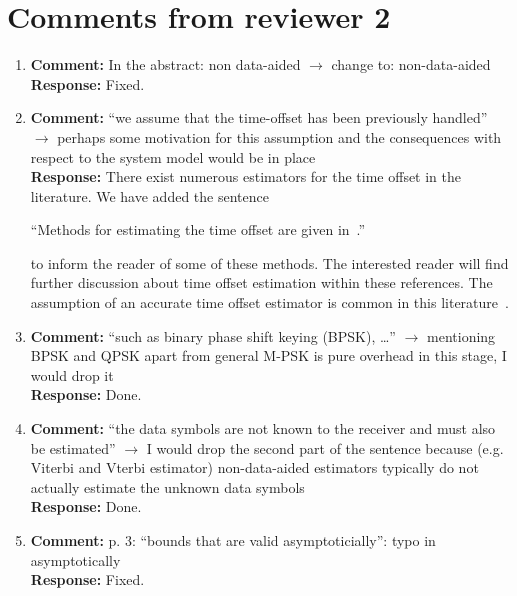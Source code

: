 \documentclass{article}
\begin{document}
\section{Comments from reviewer 2}

\begin{enumerate}

\item \textbf{Comment:} In the abstract: non data-aided $\to$ change to: non-data-aided \\
\textbf{Response:} Fixed.

\item \textbf{Comment:} ``we assume that the time-offset has been previously handled'' $\to$ perhaps some motivation for this assumption and the consequences with respect to the system model would be in place \\
\textbf{Response:}  There exist numerous estimators for the time offset in the literature.  We have added the sentence 

``Methods for estimating the time offset are given in~\cite{Massey1972optimumframe,Oerder_synch_square_circstat_2008,McKilliam_time_offset_pilots_data_2013}.'' 

to inform the reader of some of these methods.  The interested reader will find further discussion about time offset estimation within these references.  The assumption of an accurate time offset estimator is common in this literature~\cite{ViterbiViterbi_phase_est_1983,Cowley_ref_sym_carr_1998,Wilson1989,Makrakis1990,Liu1991,Mackenthun1994,Sweldens2001,McKilliamLinearTimeBlockPSK2009,Divsalar1990}.


\item \textbf{Comment:} ``such as binary phase shift keying (BPSK), \dots'' $\to$ mentioning BPSK and QPSK apart from general M-PSK is pure overhead in this stage, I would drop it \\
\textbf{Response:} Done.

\item \textbf{Comment:} ``the data symbols are not known to the receiver and must also be estimated'' $\to$ I would drop the second part of the sentence because (e.g. Viterbi and Vterbi estimator) non-data-aided estimators typically do not actually estimate the unknown data symbols \\
\textbf{Response:} Done.

\item \textbf{Comment:} p. 3: ``bounds that are valid asymptoticially'': typo in asymptotically \\
\textbf{Response:} Fixed.


\end{enumerate}
\end{document}
